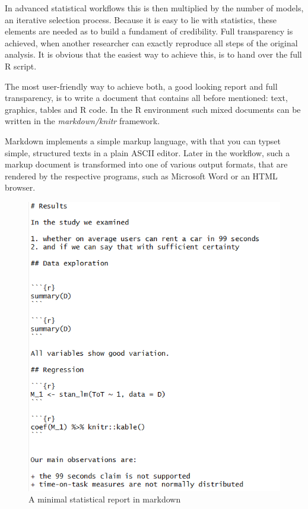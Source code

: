\documentclass[]{svmono}
\begin{document}
In advanced statistical workflows this is then multiplied by the number
of models, an iterative selection process. Because it is easy to lie
with statistics, these elements are needed as to build a fundament of
credibility. Full transparency is achieved, when another researcher can
exactly reproduce all steps of the original analysis. It is obvious that
the easiest way to achieve this, is to hand over the full R script.

The most user-friendly way to achieve both, a good looking report and
full transparency, is to write a document that contains all before
mentioned: text, graphics, tables and R code. In the R environment such
mixed documents can be written in the \emph{markdown/knitr} framework.

Markdown implements a simple markup language, with that you can typset
simple, structured texts in a plain ASCII editor. Later in the workflow,
such a markup document is transformed into one of various output
formats, that are rendered by the respective programs, such as Microsoft
Word or an HTML browser.

\begin{figure}
\centering
\includegraphics{Illustrations/markup_minimal_report.png}
\caption{A minimal statistical report in markdown}
\end{figure}
\end{document}
